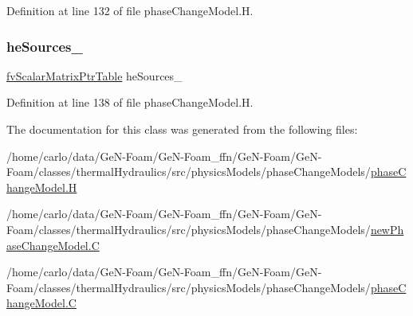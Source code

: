 Definition at line 132 of file phase\+Change\+Model.\+H.

\mbox{\label{classFoam_1_1phaseChangeModel_a1fb6dd21f501635afc552fde5a0fc7b3}} 
\subsubsection{\texorpdfstring{he\+Sources\+\_\+}{heSources\_}}
{\footnotesize\ttfamily \hyperlink{classFoam_1_1phaseChangeModel_a47dacb23df9a151e6da0902f1726ef21}{fv\+Scalar\+Matrix\+Ptr\+Table} he\+Sources\+\_\+\hspace{0.3cm}{\ttfamily [protected]}}



Definition at line 138 of file phase\+Change\+Model.\+H.



The documentation for this class was generated from the following files\+:\begin{DoxyCompactItemize}
\item 
/home/carlo/data/\+Ge\+N-\/\+Foam/\+Ge\+N-\/\+Foam\+\_\+ffn/\+Ge\+N-\/\+Foam/\+Ge\+N-\/\+Foam/classes/thermal\+Hydraulics/src/physics\+Models/phase\+Change\+Models/\hyperlink{phaseChangeModel_8H}{phase\+Change\+Model.\+H}\item 
/home/carlo/data/\+Ge\+N-\/\+Foam/\+Ge\+N-\/\+Foam\+\_\+ffn/\+Ge\+N-\/\+Foam/\+Ge\+N-\/\+Foam/classes/thermal\+Hydraulics/src/physics\+Models/phase\+Change\+Models/\hyperlink{newPhaseChangeModel_8C}{new\+Phase\+Change\+Model.\+C}\item 
/home/carlo/data/\+Ge\+N-\/\+Foam/\+Ge\+N-\/\+Foam\+\_\+ffn/\+Ge\+N-\/\+Foam/\+Ge\+N-\/\+Foam/classes/thermal\+Hydraulics/src/physics\+Models/phase\+Change\+Models/\hyperlink{phaseChangeModel_8C}{phase\+Change\+Model.\+C}\end{DoxyCompactItemize}

